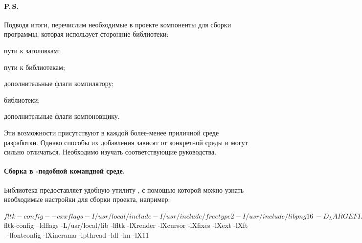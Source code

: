 \paragraph{P.\,S.}
Подводя итоги, перечислим необходимые в проекте компоненты для сборки программы, которая использует сторонние библиотеки:
\begin{itemfeature}
    \item пути к заголовкам;
    \item пути к библиотекам;
    \item дополнительные флаги компилятору;
    \item библиотеки;
    \item дополнительные флаги компоновщику.
\end{itemfeature}
Эти возможности присутствуют в каждой более-менее приличной среде разработки. Однако способы их добавления зависят от конкретной среды и могут сильно отличаться. Необходимо изучать соответствующие руководства.



%
%
%



\paragraph{Сборка в -подобной командной среде.}
Библиотека  предоставляет удобную утилиту , с помощью которой можно узнать необходимые настройки для сборки проекта, например:

\begin{consolecode}
$ fltk-config --cxxflags
-I/usr/local/include -I/usr/include/freetype2 -I/usr/include/libpng16 \
-D_LARGEFILE_SOURCE -D_LARGEFILE64_SOURCE -D_THREAD_SAFE -D_REENTRANT
$ fltk-config --ldflags
-L/usr/local/lib -lfltk -lXrender -lXcursor -lXfixes -lXext -lXft \
-lfontconfig -lXinerama -lpthread -ldl -lm -lX11
\end{consolecode}

